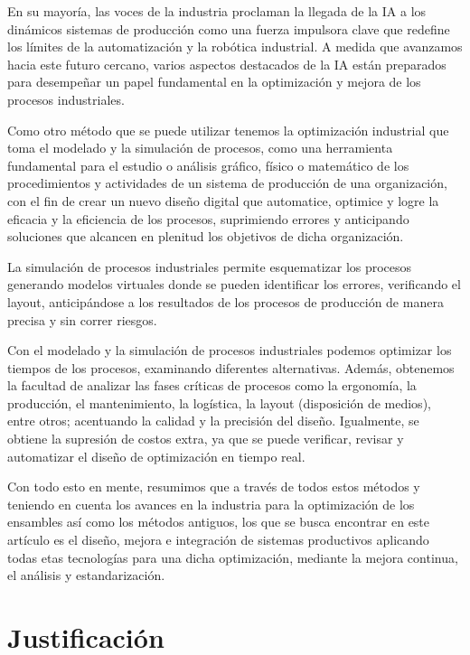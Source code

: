     En su mayoría, las voces de la industria proclaman la llegada de la IA a los dinámicos sistemas de producción como una fuerza impulsora clave que redefine los límites de la automatización y la robótica industrial. A medida que avanzamos hacia este futuro cercano, varios aspectos destacados de la IA están preparados para desempeñar un papel fundamental en la optimización y mejora de los procesos industriales. \cite{rouhiainen2018inteligencia}
    
    Como otro método que se puede utilizar tenemos la optimización industrial que toma el modelado y la simulación de procesos, como una herramienta fundamental para el estudio o análisis gráfico, físico o matemático de los procedimientos y actividades de un sistema de producción de una organización, con el fin de crear un nuevo diseño digital que automatice, optimice y logre la eficacia y la eficiencia de los procesos, suprimiendo errores y anticipando soluciones que alcancen en plenitud los objetivos de dicha organización.
    
    La simulación de procesos industriales permite esquematizar los procesos generando modelos virtuales donde se pueden identificar los errores, verificando el layout, anticipándose a los resultados de los procesos de producción de manera precisa y sin correr riesgos.
    
    Con el modelado y la simulación de procesos industriales podemos optimizar los tiempos de los procesos, examinando diferentes alternativas. Además, obtenemos la facultad de analizar las fases críticas de procesos como la ergonomía, la producción, el mantenimiento, la logística, la layout (disposición de medios), entre otros; acentuando la calidad y la precisión del diseño. Igualmente, se obtiene la supresión de costos extra, ya que se puede verificar, revisar y automatizar el diseño de optimización en tiempo real. \cite{sanchez2015analisis}
    
    Con todo esto en mente, resumimos que a través de todos estos métodos y teniendo en cuenta los avances en la industria para la optimización de los ensambles así como los métodos antiguos, los que se busca encontrar en este artículo es el diseño, mejora e integración de sistemas productivos aplicando todas etas tecnologías para una dicha optimización, mediante la mejora continua, el análisis y estandarización.
    
    
    \section{Justificación}
    
